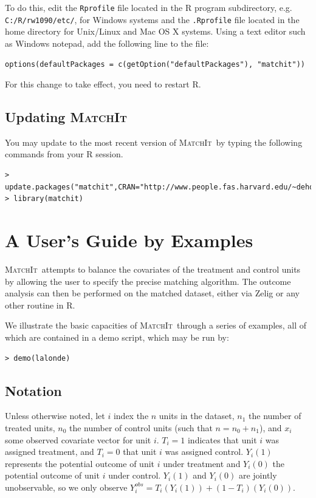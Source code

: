 \documentclass[oneside,letterpaper,titlepage]{article}
\newcommand{\MatchIt}{\textsc{MatchIt}}
\begin{document}
To do this, edit the {\tt Rprofile} file located in the R program
subdirectory, e.g. \texttt{C:/R/rw1090/etc/}, for Windows systems and
the {\tt .Rprofile} file located in the home directory for Unix/Linux
and Mac OS X systems.  Using a text editor such as Windows notepad,
add the following line to the file:
\begin{verbatim}
options(defaultPackages = c(getOption("defaultPackages"), "matchit"))
\end{verbatim}
For this change to take effect, you need to restart R.

\subsection{Updating \MatchIt}
You may update to the most recent version of \MatchIt\ by typing the
following commands from your R session.

\begin{small}
\begin{verbatim}
> update.packages("matchit",CRAN="http://www.people.fas.harvard.edu/~deho")
> library(matchit) 
\end{verbatim}
\end{small} 

\section{A User's Guide by Examples}
\MatchIt\ attempts to balance the covariates of the treatment and
control units by allowing the user to specify the precise matching
algorithm.  The outcome analysis can then be performed on the matched
dataset, either via Zelig or any other routine in R.

We illustrate the basic capacities of \MatchIt\ through a series of
examples, all of which are contained in a demo script, which may be
run by: 

\begin{verbatim}
> demo(lalonde)
\end{verbatim}

\subsection{Notation}
Unless otherwise noted, let $i$ index the $n$ units in the dataset,
$n_1$ the number of treated units, $n_0$ the number of control units
(such that $n=n_0+n_1$), and $x_i$ some observed covariate vector for
unit $i$.  $T_i=1$ indicates that unit $i$ was assigned treatment, and
$T_i=0$ that unit $i$ was assigned control.  $Y_i(1)$ represents the
potential outcome of unit $i$ under treatment and $Y_i(0)$ the
potential outcome of unit $i$ under control.  $Y_i(1)$ and $Y_i(0)$
are jointly unobservable, so we only observe
$Y_i^{obs}=T_i(Y_i(1))+(1-T_i)(Y_i(0))$.
\end{document}
